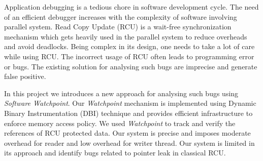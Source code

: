 Application debugging is a tedious chore in software development cycle. The need of an efficient debugger increases with the complexity of software involving parallel system. Read Copy Update (RCU) is a wait-free synchronization mechanism which gets heavily used in the parallel system to reduce overheads and avoid deadlocks. Being complex in its design, one needs to take a lot of care while using RCU. The incorrect usage of RCU often leads to programming error or bugs. The existing solution for analysing such bugs are imprecise and generate false positive. 

In this project we introduces a new approach for analysing such bugs using \emph{Software Watchpoint}. Our \emph{Watchpoint} mechanism is implemented using Dynamic Binary Instrumentation (DBI) technique and provides efficient infrastructure to enforce memory access policy. We used \emph{Watchpoint} to track and verify the references of RCU protected data. Our system is precise and imposes moderate overhead for reader and low overhead for writer thread. Our system is limited in its approach and identify bugs related to pointer leak in classical RCU. 
